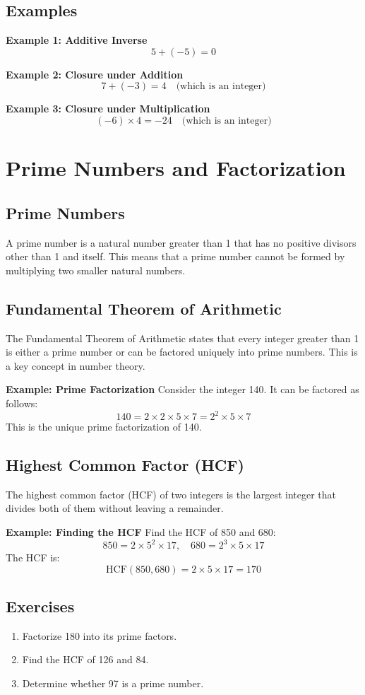\documentclass{article}
\begin{document}
\subsection{Examples}
\textbf{Example 1: Additive Inverse}
\[
5 + (-5) = 0
\]

\textbf{Example 2: Closure under Addition}
\[
7 + (-3) = 4 \quad \text{(which is an integer)}
\]

\textbf{Example 3: Closure under Multiplication}
\[
(-6) \times 4 = -24 \quad \text{(which is an integer)}
\]

\section{Prime Numbers and Factorization}
\subsection{Prime Numbers}
A prime number is a natural number greater than 1 that has no positive divisors other than 1 and itself. This means that a prime number cannot be formed by multiplying two smaller natural numbers.

\subsection{Fundamental Theorem of Arithmetic}
The Fundamental Theorem of Arithmetic states that every integer greater than 1 is either a prime number or can be factored uniquely into prime numbers. This is a key concept in number theory.

\textbf{Example: Prime Factorization}
Consider the integer 140. It can be factored as follows:
\[
140 = 2 \times 2 \times 5 \times 7 = 2^2 \times 5 \times 7
\]
This is the unique prime factorization of 140.

\subsection{Highest Common Factor (HCF)}
The highest common factor (HCF) of two integers is the largest integer that divides both of them without leaving a remainder.

\textbf{Example: Finding the HCF}
Find the HCF of 850 and 680:
\[
850 = 2 \times 5^2 \times 17, \quad 680 = 2^3 \times 5 \times 17
\]
The HCF is:
\[
\text{HCF}(850, 680) = 2 \times 5 \times 17 = 170
\]

\subsection{Exercises}
\begin{enumerate}
    \item Factorize 180 into its prime factors.
    \item Find the HCF of 126 and 84.
    \item Determine whether 97 is a prime number.
\end{enumerate}
\end{document}
